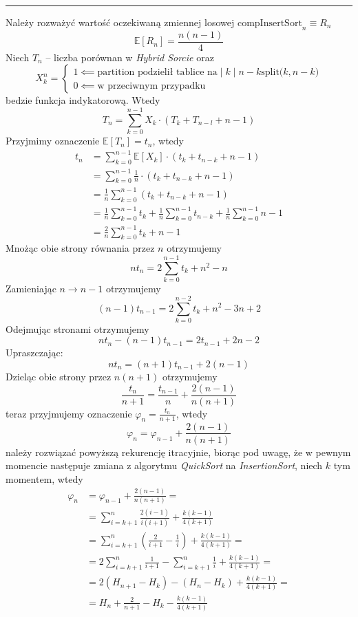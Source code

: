 \documentclass[11pt,a4paper]{article}
\begin{document}
\bigskip
\hrule
\bigskip

Należy rozważyć wartość oczekiwaną zmiennej losowej $\text{compInsertSort}_n \equiv R_n$
\[
    \mathbb{E}[R_n]=\frac{n(n-1)}{4}
\]
Niech $T_n$ -- liczba porównan w \textit{Hybrid Sorcie} oraz
\[
    X_k^n = \begin{cases}
        1 \impliedby \text{partition podzielił tablice na} \mid k \mid n-k \text{split($k,n-k$)}\\
        0 \impliedby \text{w przeciwnym przypadku}
    \end{cases}
\]
bedzie funkcja indykatorową. Wtedy
\[
    T_n = \sum_{k=0}^{n-1} X_k \cdot \left(T_k + T_{n-l} + n-1 \right)
\]
Przyjmimy oznaczenie $\mathbb{E}[T_n]=t_n$, wtedy
\begin{equation*}\begin{aligned}
    t_n &= \sum_{k=0}^{n-1} \mathbb{E}[X_k] \cdot \left(t_k + t_{n-k} + n-1 \right) \\
        &= \sum_{k=0}^{n-1} \frac{1}{n} \cdot \left(t_k + t_{n-k} + n-1 \right) \\
        &= \frac{1}{n} \sum_{k=0}^{n-1} \left(t_k + t_{n-k} + n-1 \right) \\
        &= \frac{1}{n} \sum_{k=0}^{n-1} t_k + \frac{1}{n} \sum_{k=0}^{n-1} t_{n-k} + \frac{1}{n} \sum_{k=0}^{n-1} n-1 \\
        &= \frac{2}{n} \sum_{k=0}^{n-1} t_k + n-1
\end{aligned}\end{equation*}
Mnożąc obie strony równania przez $n$ otrzymujemy
\[
    n t_n = 2 \sum_{k=0}^{n-1} t_k + n^2 - n
\]
Zamieniając $n \rightarrow n-1$ otrzymujemy
\[
    (n-1) t_{n-1} = 2 \sum_{k=0}^{n-2} t_k + n^2 - 3n + 2
\]
Odejmując stronami otrzymujemy
\[
    n t_n - (n-1) t_{n-1} = 2t_{n-1} + 2n - 2
\]
Upraszczając:
\[
    n t_n = (n+1) t_{n-1} + 2(n - 1)
\]
Dzieląc obie strony przez $n(n+1)$ otrzymujemy
\[
    \frac{t_n}{n+1} = \frac{t_{n-1}}{n} + \frac{2(n-1)}{n(n+1)}
\]
teraz przyjmujemy oznaczenie $\varphi_n = \frac{t_n}{n+1}$, wtedy
\[
    \varphi_n = \varphi_{n-1} + \frac{2(n-1)}{n(n+1)}
\]
należy rozwiązać powyższą rekurencję itracyjnie, biorąc pod uwagę, że w pewnym momencie następuje zmiana z algorytmu \textit{QuickSort} na \textit{InsertionSort}, niech $k$ tym momentem, wtedy
\begin{equation*}\begin{aligned}
    \varphi_n &= \varphi_{n-1} + \frac{2(n-1)}{n(n+1)} =\\
              &= \sum_{i=k+1}^{n} \frac{2(i-1)}{i(i+1)} + \frac{k(k-1)}{4(k+1)} \\
              &= \sum_{i=k+1}^{n} \left(\frac{2}{i+1} - \frac{1}{i}\right) + \frac{k(k-1)}{4(k+1)} =\\
              &= 2\sum_{i=k+1}^{n} \frac{1}{i+1} - \sum_{i=k+1}^{n} \frac{1}{i} + \frac{k(k-1)}{4(k+1)} =\\
              &= 2\left( H_{n+1} - H_{k} \right) - \left( H_{n} - H_{k} \right) + \frac{k(k-1)}{4(k+1)} =\\
              &= H_{n} + \frac{2}{n+1} -  H_{k} - \frac{k(k-1)}{4(k+1)}
\end{aligned}\end{equation*}
\end{document}
